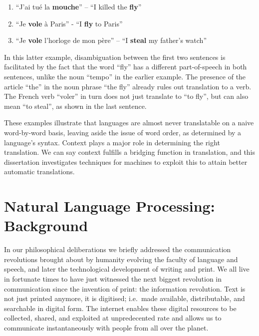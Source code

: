 \begin{enumerate}
\item ``J'ai tué la \textbf{mouche}'' -- ``I killed the \textbf{fly}''
\item ``Je \textbf{vole} à Paris'' - ``I \textbf{fly} to Paris''
\item ``Je \textbf{vole} l'horloge de mon père'' -- ``I \textbf{steal} my father's watch''
\end{enumerate}

In this latter example, disambiguation between the first two sentences is
facilitated by the fact that the word ``fly'' has a different
part-of-speech in both sentences, unlike the noun ``tempo'' in the earlier example.
The presence of the article ``the'' in the noun phrase ``the fly'' already
rules out translation to a verb. The French verb ``voler'' in turn does not
just translate to ``to fly'', but can also mean ``to steal'', as shown in
the last sentence.

These examples illustrate that languages are almost never translatable on a
naive word-by-word basis, leaving aside the issue of word order, as
determined by a language's syntax. Context plays a major role in determining
the right translation. We can say context fulfills a bridging function in
translation, and this dissertation investigates techniques for machines to
exploit this to attain better automatic translations.

\section{Natural Language Processing: Background}

In our philosophical deliberations we briefly addressed the communication
revolutions brought about by humanity evolving the faculty of language and
speech, and later the technological development of writing and print. We all
live in fortunate times to have just witnessed the next biggest revolution in
communication since the invention of print: the information revolution. Text is
not just printed anymore, it is digitised; i.e.\ made available, distributable,
and searchable in digital form. The internet enables these digital resources to
be collected, shared, and exploited at unpredecented rate and allows us to
communicate instantaneously with people from all over the planet.


